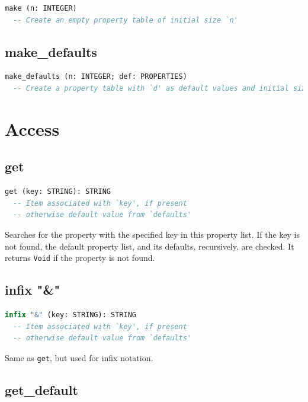 \documentclass[a4paper,fleqn]{report}
\begin{document}
\begin{lstlisting}[language=Eiffel]
make (n: INTEGER)
  -- Create an empty property table of initial size `n'
\end{lstlisting}


\subsection{make\_defaults}
\label{sec:make_defaults}

\begin{lstlisting}[language=Eiffel]
make_defaults (n: INTEGER; def: PROPERTIES)
  -- Create a property table with `d' as default values and initial size `n'
\end{lstlisting}


\section{Access}
\label{sec:access}


\subsection{get}
\label{sec:get}

\begin{lstlisting}[language=Eiffel]
get (key: STRING): STRING
  -- Item associated with `key', if present
  -- otherwise default value from `defaults'
\end{lstlisting}

Searches for the property with the specified key in this property
list. If the key is not found, the default property list, and its
defaults, recursively, are checked. It returns \texttt{Void} if the
property is not found.

\pagebreak

\subsection{infix "\&"}
\label{sec:infix_ampersand}

\begin{lstlisting}[language=Eiffel]
infix "&" (key: STRING): STRING
  -- Item associated with `key', if present
  -- otherwise default value from `defaults'
\end{lstlisting}

Same as \texttt{get}, but used for infix notation.


\subsection{get\_default}
\label{sec:get_default}
\end{document}

